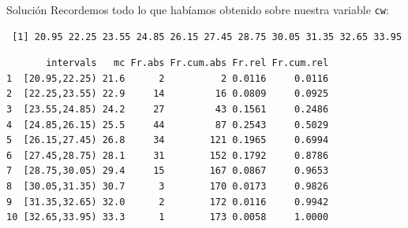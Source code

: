 \documentclass[
  ignorenonframetext,
  aspectratio=169]{beamer}
\begin{document}
\begin{frame}[fragile]{Solución}
\label{soluciuxf3n-30}
Recordemos todo lo que habíamos obtenido sobre nuestra variable
\texttt{cw}:

\begin{verbatim}
 [1] 20.95 22.25 23.55 24.85 26.15 27.45 28.75 30.05 31.35 32.65 33.95
\end{verbatim}

\begin{verbatim}
       intervals   mc Fr.abs Fr.cum.abs Fr.rel Fr.cum.rel
1  [20.95,22.25) 21.6      2          2 0.0116     0.0116
2  [22.25,23.55) 22.9     14         16 0.0809     0.0925
3  [23.55,24.85) 24.2     27         43 0.1561     0.2486
4  [24.85,26.15) 25.5     44         87 0.2543     0.5029
5  [26.15,27.45) 26.8     34        121 0.1965     0.6994
6  [27.45,28.75) 28.1     31        152 0.1792     0.8786
7  [28.75,30.05) 29.4     15        167 0.0867     0.9653
8  [30.05,31.35) 30.7      3        170 0.0173     0.9826
9  [31.35,32.65) 32.0      2        172 0.0116     0.9942
10 [32.65,33.95) 33.3      1        173 0.0058     1.0000
\end{verbatim}
\end{frame}
\end{document}
